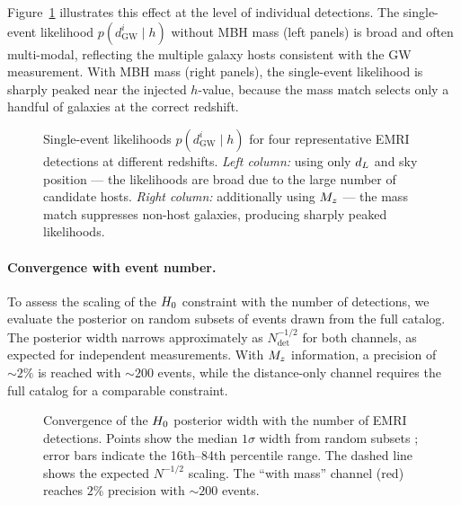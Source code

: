 Figure~\ref{fig:single_event} illustrates this effect at the level of
individual detections. The single-event likelihood
$p(d_\mathrm{GW}^i \mid h)$ without MBH mass (left panels) is
broad and often multi-modal, reflecting the multiple galaxy hosts
consistent with the GW measurement. With MBH mass (right panels), the
single-event likelihood is sharply peaked near the injected $h$-value,
because the mass match selects only a handful of galaxies at the correct
redshift.

\begin{figure}[t]
  \centering
  \caption{Single-event likelihoods $p(d_\mathrm{GW}^i \mid h)$ for
  four representative EMRI detections at different redshifts.
  \emph{Left column:} using only $d_L$ and sky position --- the
  likelihoods are broad due to the large number of candidate hosts.
  \emph{Right column:} additionally using $M_z$ --- the mass match
  suppresses non-host galaxies, producing sharply peaked likelihoods.}
  \label{fig:single_event}
\end{figure}

\paragraph{Convergence with event number.}
To assess the scaling of the $H_0$ constraint with the number of
detections, we evaluate the posterior on random subsets of
 events drawn from the full catalog.
The
posterior width narrows approximately as $N_\mathrm{det}^{-1/2}$
for both channels, as expected for independent measurements. With $M_z$
information, a precision of $\sim 2\%$ is reached with
$\sim 200$ events, while the distance-only channel requires the full
catalog for a comparable constraint.

\begin{figure}[t]
  \centering
  \caption{Convergence of the $H_0$ posterior width with the number of
  EMRI detections. Points show the median $1\sigma$ width from
   random subsets
  ; error bars indicate the
  16th--84th percentile range. The dashed line shows the expected
  $N^{-1/2}$ scaling. The ``with mass'' channel (red) reaches $2\%$
  precision with $\sim 200$ events.}
  \label{fig:posterior_convergence}
\end{figure}

